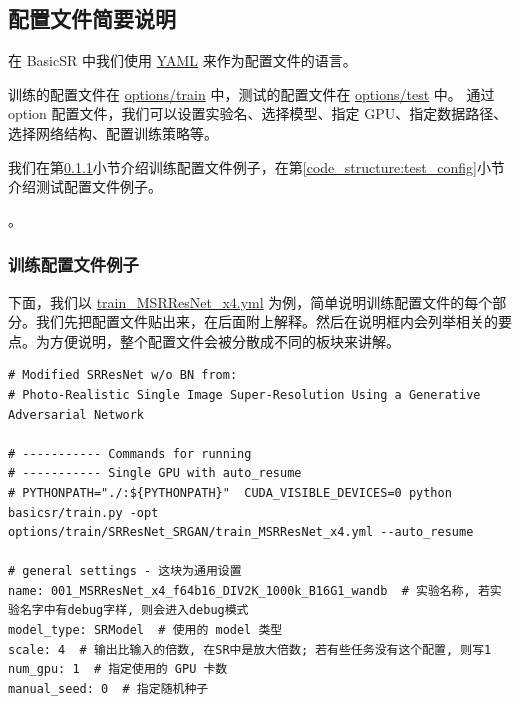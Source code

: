 \documentclass[../main.tex]{subfiles}
\begin{document}
\subsection{配置文件简要说明}\label{code_structure:config_example}

在 BasicSR 中我们使用 \href{https://yaml.org/}{YAML} 来作为配置文件的语言。

训练的配置文件在 \href{https://github.com/XPixelGroup/BasicSR/tree/master/options/train}{options/train} 中，测试的配置文件在 \href{https://github.com/XPixelGroup/BasicSR/tree/master/options/test}{options/test} 中。
通过 option 配置文件，我们可以设置实验名、选择模型、指定 GPU、指定数据路径、选择网络结构、配置训练策略等。

我们在第\ref{code_structure:train_config}小节介绍训练配置文件例子，在第\ref{code_structure:test_config}小节介绍测试配置文件例子。

。

\subsubsection{训练配置文件例子}\label{code_structure:train_config}

下面，我们以 \href{https://github.com/XPixelGroup/BasicSR/blob/master/options/train/SRResNet_SRGAN/train_MSRResNet_x4.yml}{train\_MSRResNet\_x4.yml} 为例，简单说明训练配置文件的每个部分。我们先把配置文件贴出来，在后面附上解释。然后在说明框内会列举相关的要点。为方便说明，整个配置文件会被分散成不同的板块来讲解。

\begin{verbatim}
# Modified SRResNet w/o BN from:
# Photo-Realistic Single Image Super-Resolution Using a Generative Adversarial Network

# ----------- Commands for running
# ----------- Single GPU with auto_resume
# PYTHONPATH="./:${PYTHONPATH}"  CUDA_VISIBLE_DEVICES=0 python basicsr/train.py -opt options/train/SRResNet_SRGAN/train_MSRResNet_x4.yml --auto_resume

# general settings - 这块为通用设置
name: 001_MSRResNet_x4_f64b16_DIV2K_1000k_B16G1_wandb  # 实验名称, 若实验名字中有debug字样, 则会进入debug模式
model_type: SRModel  # 使用的 model 类型
scale: 4  # 输出比输入的倍数, 在SR中是放大倍数; 若有些任务没有这个配置, 则写1
num_gpu: 1  # 指定使用的 GPU 卡数
manual_seed: 0  # 指定随机种子
\end{verbatim}
\end{document}
